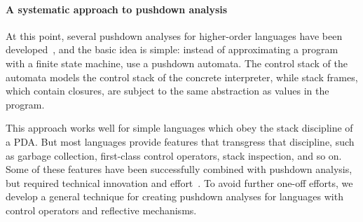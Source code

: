 %


\paragraph{A systematic approach to pushdown analysis}

At this point, several pushdown analyses for higher-order languages
have been developed~\cite{dvanhorn:Vardoulakis2011CFA2,
dvanhorn:Earl2010Pushdown}, and the basic idea is simple: instead of
approximating a program with a finite state machine, use a pushdown
automata.  The control stack of the automata models the control stack
of the concrete interpreter, while stack frames, which contain
closures, are subject to the same abstraction as values in the
program.

This approach works well for simple languages which obey the stack
discipline of a PDA.  But most languages provide features that
transgress that discipline, such as garbage collection, first-class
control operators, stack inspection, and so on.  Some of these
features have been successfully combined with pushdown analysis, but
required technical innovation and
effort~\cite{dvanhorn:Vardoulakis2011Pushdown,
ianjohnson:DBLP:journals/jfp/JohnsonSEMH14,
dvanhorn:Earl2012Introspective}.  To avoid further one-off efforts, we
develop a general technique for creating pushdown analyses for
languages with control operators and reflective mechanisms.
